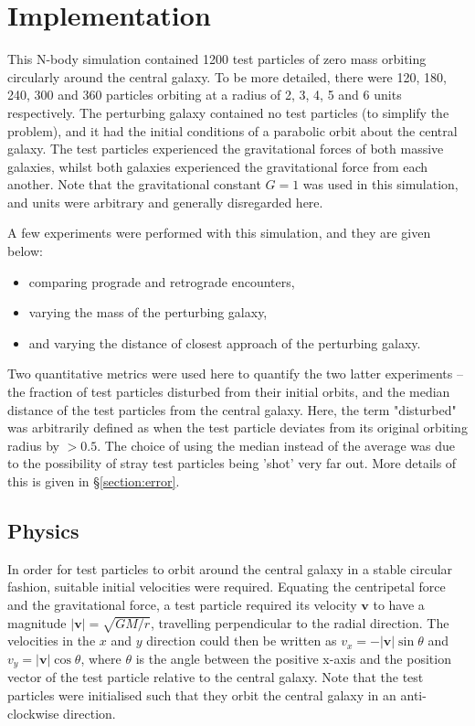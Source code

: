 \documentclass[twoside,twocolumn]{article}
\begin{document}
\section{Implementation}
    \label{section:implementation}

    This N-body simulation contained 1200 test particles of zero mass orbiting circularly around the central galaxy. To be more detailed, there were 120, 180, 240, 300 and 360 particles orbiting at a radius of 2, 3, 4, 5 and 6 units respectively. The perturbing galaxy contained no test particles (to simplify the problem), and it had the initial conditions of a parabolic orbit about the central galaxy. The test particles experienced the gravitational forces of both massive galaxies, whilst both galaxies experienced the gravitational force from each another. Note that the gravitational constant $G = 1$ was used in this simulation, and units were arbitrary and generally disregarded here.

    A few experiments were performed with this simulation, and they are given below:
    \begin{itemize}
        \item comparing prograde and retrograde encounters,
        \item varying the mass of the perturbing galaxy,
        \item and varying the distance of closest approach of the perturbing galaxy.
    \end{itemize}
    Two quantitative metrics were used here to quantify the two latter experiments -- the fraction of test particles disturbed from their initial orbits, and the median distance of the test particles from the central galaxy. Here, the term "disturbed" was arbitrarily defined as when the test particle deviates from its original orbiting radius by $>0.5$. The choice of using the median instead of the average was due to the possibility of stray test particles being 'shot' very far out. More details of this is given in \S \ref{section:error}.

    \subsection{Physics}
        \label{section:physics}

        In order for test particles to orbit around the central galaxy in a stable circular fashion, suitable initial velocities were required. Equating the centripetal force and the gravitational force, a test particle required its velocity $\bm{v}$ to have a magnitude $\lvert\bm{v}\lvert = \sqrt{GM/r}$, travelling perpendicular to the radial direction. The velocities in the $x$ and $y$ direction could then be written as $v_x = - \lvert\bm{v}\lvert \sin{\theta}$ and $v_y = \lvert\bm{v}\lvert \cos{\theta}$, where $\theta$ is the angle between the positive x-axis and the position vector of the test particle relative to the central galaxy. Note that the test particles were initialised such that they orbit the central galaxy in an anti-clockwise direction.
\end{document}
